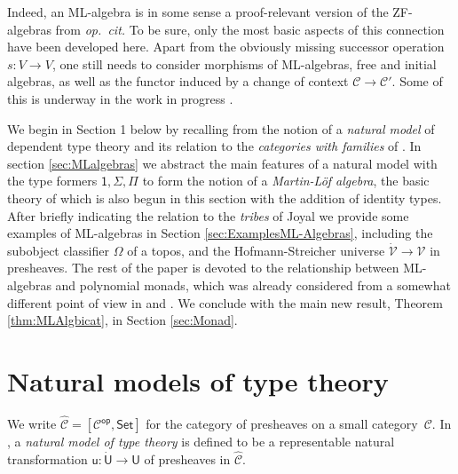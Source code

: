 \documentclass[12pt,reqno]{amsart}
\newcommand{\C}{\ensuremath{\mathbb{C}}}
\newcommand{\CC}{\ensuremath{\mathcal{C}}}
\newcommand{\op}[1]{\ensuremath{{#1}^{\mathsf{op}}}}
\newcommand{\psh}[1]{\ensuremath{[\op{#1},\mathsf{Set}]}}
\newcommand{\Set}{\ensuremath{\mathsf{Set}}}
\renewcommand{\to}{\ensuremath{\rightarrow}}
\renewcommand{\t}{\ensuremath{\mathsf{u}}}
\newcommand{\T}{\ensuremath{\mathsf{U}}}
\newcommand{\TT}{\ensuremath{\dot{\mathsf{U}}}}
\newcommand{\V}{\ensuremath{\mathcal{V}}}
\newcommand{\VV}{\ensuremath{\dot{\mathcal{V}}}}
\theoremstyle{remark}
\theoremstyle{definition}
\begin{document}
Indeed, an ML-algebra is in some sense a proof-relevant version of the ZF-algebras from \emph{op.\ cit.}  To be sure, only the most basic aspects of this connection have been developed here.   Apart from the obviously missing successor operation $s : V\to V$, one still needs to consider morphisms of ML-algebras, free and initial algebras, as well as the functor induced by a change of context $\CC \to \CC'$. Some of this is underway in the work in progress \cite{Fernando}.
\medskip

We begin in Section 1 below by recalling from \cite{awodey:NM} the notion of a \emph{natural model} of dependent type theory and its relation to the \emph{categories with families} of \cite{Dybjer:CWF}.  In section \ref{sec:MLalgebras} we abstract the main features of a natural model with the type formers $\mathsf{1}, \Sigma, \Pi$ to form the notion of a \emph{Martin-L\"of algebra}, the basic theory of which is also begun in this section with the addition of identity types.   After briefly indicating the relation to the \emph{tribes} of Joyal \cite{Joyal:CandT} we provide some examples of ML-algebras in Section \ref{sec:ExamplesML-Algebras}, including the subobject classifier $\Omega$ of a topos, and the Hofmann-Streicher universe $\VV\to\V$ in presheaves.  The rest of the paper is devoted to the relationship between ML-algebras and polynomial monads, which was already considered from a somewhat different point of view in \cite{ Newstead:thesis} and \cite{NA:2018}.  We conclude with the main new result, Theorem \ref{thm:MLAlgbicat}, in Section \ref{sec:Monad}. 

\section{Natural models of type theory}\label{sec:NaturalModels}

\noindent We write $\widehat{\CC} = \psh{\CC}$ for the category of presheaves on a small category~$\CC$. 
In \cite{awodey:NM}, a \emph{natural model of type theory} is defined to be a representable natural transformation $\t: \TT\to \T$ of presheaves in $\widehat{\CC}$.  
\end{document}
